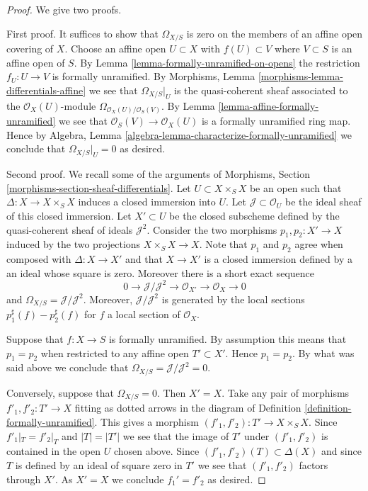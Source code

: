 \begin{proof}
We give two proofs.

\medskip\noindent
First proof. It suffices to show that $\Omega_{X/S}$ is zero on the members of
an affine open covering of $X$. Choose an affine open $U \subset X$
with $f(U) \subset V$ where $V \subset S$ is an affine open of $S$. By
Lemma \ref{lemma-formally-unramified-on-opens}
the restriction $f_U : U \to V$ is formally unramified. By
Morphisms, Lemma \ref{morphisms-lemma-differentials-affine}
we see that $\Omega_{X/S}|_U$ is the quasi-coherent sheaf associated to
the $\mathcal{O}_X(U)$-module $\Omega_{\mathcal{O}_X(U)/\mathcal{O}_S(V)}$. By
Lemma \ref{lemma-affine-formally-unramified}
we see that $\mathcal{O}_S(V) \to \mathcal{O}_X(U)$ is a formally unramified
ring map. Hence by
Algebra, Lemma \ref{algebra-lemma-characterize-formally-unramified}
we conclude that $\Omega_{X/S}|_U = 0$ as desired.

\medskip\noindent
Second proof. We recall some of the arguments of
Morphisms, Section \ref{morphisms-section-sheaf-differentials}.
Let $U \subset X \times_S X$ be an open such that
$\Delta : X \to X \times_S X$ induces a closed immersion into $U$.
Let $\mathcal{J} \subset \mathcal{O}_U$ be the ideal sheaf of this
closed immersion. Let $X' \subset U$ be the closed subscheme
defined by the quasi-coherent sheaf of ideals $\mathcal{J}^2$.
Consider the two morphisms $p_1, p_2 : X' \to X$ induced by
the two projections $X \times_S X \to X$.
Note that $p_1$ and $p_2$ agree when composed with $\Delta : X \to X'$
and that $X \to X'$ is a closed immersion defined by a an ideal
whose square is zero. Moreover there is a short exact sequence
$$
0 \to \mathcal{J}/\mathcal{J}^2 \to \mathcal{O}_{X'} \to \mathcal{O}_X \to 0
$$
and $\Omega_{X/S} = \mathcal{J}/\mathcal{J}^2$. Moreover,
$\mathcal{J}/\mathcal{J}^2$ is generated by the local
sections $p_1^\sharp(f) - p_2^\sharp(f)$ for $f$ a local section of
$\mathcal{O}_X$.

\medskip\noindent
Suppose that $f : X \to S$ is formally unramified.
By assumption this means that $p_1 = p_2$ when restricted to any
affine open $T' \subset X'$. Hence $p_1 = p_2$. By what was said above
we conclude that $\Omega_{X/S} = \mathcal{J}/\mathcal{J}^2 = 0$.

\medskip\noindent
Conversely, suppose that $\Omega_{X/S} = 0$. Then $X' = X$. Take any pair
of morphisms $f'_1, f'_2 : T' \to X$ fitting as dotted arrows in
the diagram of
Definition \ref{definition-formally-unramified}.
This gives a morphism $(f'_1, f'_2) : T' \to X \times_S X$.
Since $f'_1|_T = f'_2|_T$ and $|T| =|T'|$ we see that the image of $T'$
under $(f'_1, f'_2)$ is contained in the open $U$ chosen above. Since
$(f'_1, f'_2)(T) \subset \Delta(X)$ and since $T$ is defined by an ideal
of square zero in $T'$ we see that $(f'_1, f'_2)$ factors through $X'$.
As $X' = X$ we conclude $f_1' = f'_2$ as desired.
\end{proof}

